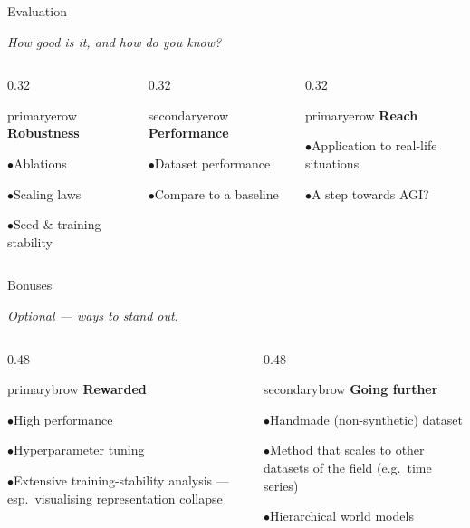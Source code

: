 \documentclass[aspectratio=169]{beamer}
\newcommand{\cardtitle}[2]{\textbf{\color{#1}#2}\par\vspace{5pt}}
\newcommand{\qitem}[1]{\textcolor{secondary}{\footnotesize$\bullet$}\hspace{4pt}#1\par\vspace{3pt}}
\begin{document}
\begin{frame}{Evaluation}
  \begin{center}
    \small\itshape How good is it, and how do you know?
  \end{center}
  \vspace{0.35cm}

  \begin{columns}[T]
    \begin{column}{0.32\textwidth}
      \begin{qbox}{primary}{erow}
        \cardtitle{primary}{Robustness}
        \footnotesize
        \qitem{Ablations}
        \qitem{Scaling laws}
        \qitem{Seed \& training stability}
      \end{qbox}
    \end{column}
    \begin{column}{0.32\textwidth}
      \begin{qbox}{secondary}{erow}
        \cardtitle{secondary}{Performance}
        \footnotesize
        \qitem{Dataset performance}
        \qitem{Compare to a baseline}
      \end{qbox}
    \end{column}
    \begin{column}{0.32\textwidth}
      \begin{qbox}{primary}{erow}
        \cardtitle{primary}{Reach}
        \footnotesize
        \qitem{Application to real-life situations}
        \qitem{A step towards AGI?}
      \end{qbox}
    \end{column}
  \end{columns}
\end{frame}

\begin{frame}{Bonuses}
  \begin{center}
    \small\itshape Optional — ways to stand out.
  \end{center}
  \vspace{0.35cm}

  \begin{columns}[T]
    \begin{column}{0.48\textwidth}
      \begin{qbox}{primary}{brow}
        \cardtitle{primary}{Rewarded}
        \footnotesize
        \qitem{High performance}
        \qitem{Hyperparameter tuning}
        \qitem{Extensive training-stability analysis — esp.\ visualising representation collapse}
      \end{qbox}
    \end{column}
    \begin{column}{0.48\textwidth}
      \begin{qbox}{secondary}{brow}
        \cardtitle{secondary}{Going further}
        \footnotesize
        \qitem{Handmade (non-synthetic) dataset}
        \qitem{Method that scales to other datasets of the field (e.g.\ time series)}
        \qitem{Hierarchical world models}
      \end{qbox}
    \end{column}
  \end{columns}
\end{frame}
\end{document}
